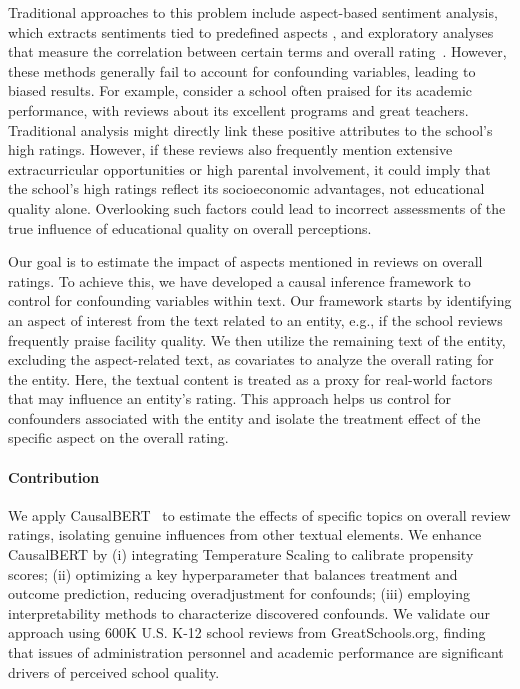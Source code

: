 \documentclass[11pt]{article}
\begin{document}
Traditional approaches to this problem include aspect-based sentiment analysis, which extracts sentiments tied to predefined aspects \cite{zhang2022survey, kandhro2024exploring}, and exploratory analyses that measure the correlation between certain terms and overall rating~\cite{geetha2017relationship}. However, these methods generally fail to account for confounding variables, leading to biased results. For example, consider a school often praised for its academic performance, with reviews about its excellent programs and great teachers. Traditional analysis might directly link these positive attributes to the school's high ratings. However, if these reviews also frequently mention extensive extracurricular opportunities or high parental involvement, it could imply that the school's high ratings reflect its socioeconomic advantages, not educational quality alone. 
Overlooking such factors could lead to incorrect assessments of the true influence of educational quality on overall perceptions.

Our goal is to estimate the impact of aspects mentioned in reviews on overall ratings. To achieve this, we have developed a causal inference framework to control for confounding variables within text. Our framework starts by identifying an aspect of interest from the text related to an entity, e.g., if the school reviews frequently praise facility quality. We then utilize the remaining text of the entity, excluding the aspect-related text, as covariates to analyze the overall rating for the entity. Here, the textual content is treated as a proxy for real-world factors that may influence an entity’s rating. This approach helps us control for confounders associated with the entity and isolate the treatment effect of the specific aspect on the overall rating.

\vspace{-.2cm}
\paragraph{Contribution}
 

We apply CausalBERT~\cite{veitch2020adapting} to estimate the effects of specific topics on overall review ratings, isolating genuine influences from other textual elements.  We enhance CausalBERT by (i) integrating Temperature Scaling to calibrate propensity scores; (ii) optimizing a key hyperparameter that balances treatment and outcome prediction, reducing overadjustment for confounds; (iii) employing interpretability methods to characterize discovered confounds. We validate our approach using 600K U.S. K-12 school reviews from GreatSchools.org, finding that issues of administration personnel and academic performance are significant drivers of perceived school quality.
\end{document}

